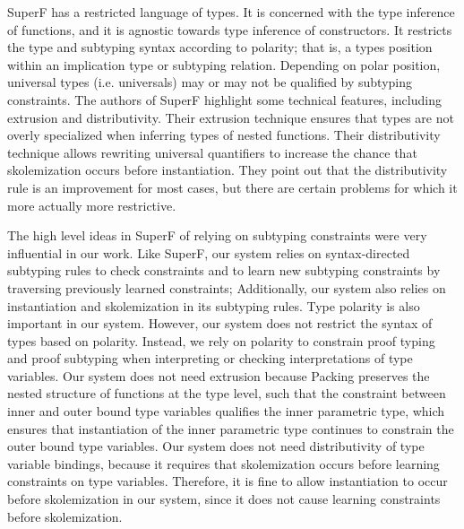 \documentclass[acmsmall]{acmart}
\theoremstyle{definition}
\begin{document}
SuperF has a restricted language of types. It is concerned with the type inference
of functions, and it is agnostic towards type inference of constructors. 
It restricts the type and subtyping syntax according to polarity; that is, a
types position within an implication type or subtyping relation. Depending on polar position,
universal types (i.e. universals) may or may not be qualified by subtyping constraints.
The authors of SuperF highlight some technical features, including extrusion and distributivity.
Their extrusion technique ensures that types are not overly specialized
when inferring types of nested functions. Their distributivity technique allows
rewriting universal quantifiers to increase the chance that skolemization occurs before instantiation. 
They point out that the distributivity rule is an improvement for most cases, but there are certain
problems for which it more actually more restrictive.


The high level ideas in SuperF of relying on subtyping constraints were very influential in our work.
Like SuperF, our system relies on syntax-directed subtyping rules to check constraints and to learn 
new subtyping constraints by traversing previously learned constraints;
Additionally, our system also relies on instantiation and skolemization in its subtyping rules. 
Type polarity is also important in our system.
However, our system does not restrict the syntax of types based on polarity. Instead, we rely on
polarity to constrain proof typing and proof subtyping when interpreting or checking interpretations
of type variables.    
Our system does not need extrusion because Packing  preserves the nested structure of 
functions at the type level, such that the constraint between inner and outer bound type variables
qualifies the inner parametric type, which ensures that instantiation of the inner parametric type 
continues to constrain the outer bound type variables.  
Our system does not need distributivity of type variable bindings, because it requires
that skolemization occurs before learning constraints on type variables. Therefore, it is fine to allow
instantiation to occur before skolemization in our system, 
since it does not cause learning constraints before skolemization.  



\end{document}
